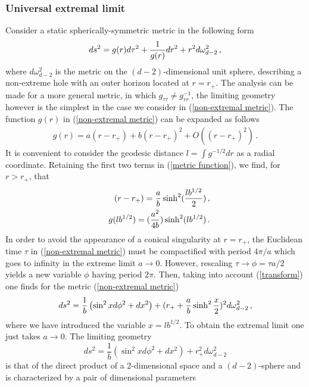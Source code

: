 \documentclass[12pt]{article}
\def\be{\begin{eqnarray}}
\def\ee{\end{eqnarray}}
\begin{document}
\subsubsection{Universal extremal limit}  


Consider a static spherically-symmetric  metric in the following form
\begin{eqnarray}
ds^2=g(r)d\tau^2+{1\over g(r)}dr^2+r^2d\omega^2_{d-2}\, ,
\label{non-extremal metric}
\end{eqnarray}
where $d\omega^2_{d-2}$ is the metric on the $(d-2)$-dimensional unit sphere,
describing a non-extreme hole with an outer horizon located at $r=r_+$. The analysis can be made for a more general metric, in which $g_{\tau\tau}\neq g^{-1}_{rr}$, the limiting geometry however is the simplest  in the case we consider in (\ref{non-extremal metric}). 
The function $g(r)$ in (\ref{non-extremal metric}) can be expanded as follows
\begin{eqnarray}
g(r)=a(r-r_+)+b(r-r_+)^2+O((r-r_+)^2)\, .
\label{metric function}
\end{eqnarray}
It is convenient to consider the geodesic distance $l=\int g^{-1/2}dr$ as a
radial coordinate. Retaining the first two terms in (\ref{metric function}), we find, for $r>r_+$, that
\be
&&(r-r_+)={a\over b} \sinh^2 ({lb^{1/2}\over 2})\, , \nonumber \\
&&g(lb^{1/2})=({a^2\over 4b})\sinh^2({lb^{1/2}})\, .
\label{transform}
\ee
In order to avoid the appearance of a conical singularity at $r=r_+$,
the Euclidean time $\tau$ in (\ref{non-extremal metric}) must be compactified with
period $4\pi/a$
which goes to infinity in the extreme limit
$a\rightarrow 0$. However, rescaling $\tau \rightarrow \phi=\tau{a/ 2}$
yields a new variable $\phi$ having period $2\pi$. Then, taking into
account (\ref{transform})  one finds for the metric (\ref{non-extremal metric})
\begin{eqnarray}
ds^2=\frac{1}{b}\left(\sin^2xd\phi^2+dx^2\right)
+(r_++{a\over b}\sinh^2{x\over 2})^2d\omega^2_{d-2}\, ,
\label{approximate metric}
\end{eqnarray}
where we have introduced the variable $x=lb^{1/2}$.
To obtain the extremal limit one just takes $a\rightarrow 0$. 
The limiting geometry 
\begin{equation}
ds^2=\frac{1}{b}\left(\sin^2 xd\phi^2+dx^2\right)+ r^2_+d\omega^2_{d-2}
\label{limiting metric}
\end{equation}
is that of the direct product of a 2-dimensional space and a $(d-2)$-sphere and is
characterized by a pair of dimensional parameters
\end{document}
